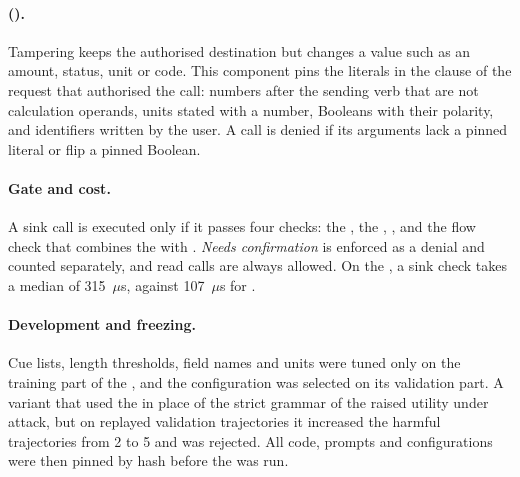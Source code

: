 \paragraph{\PThree{} (\cThree).} Tampering keeps the authorised destination but changes a value such as an amount,
status, unit or code. This component pins the literals in the clause of the request that authorised the call: numbers
after the sending verb that are not calculation operands, units stated with a number, Booleans with their polarity,
and identifiers written by the user. A call is denied if its arguments lack a pinned literal or flip a pinned Boolean.

\paragraph{Gate and cost.} A sink call is executed only if it passes four checks: the \rSig, the \pOne, \pThree, and the
flow check that combines the \rFlow{} with \pTwo. \emph{Needs confirmation} is enforced as a denial and counted
separately, and read calls are always allowed. On the \dev, a sink check takes a median of 315~$\mu$s, against
107~$\mu$s for \strSand.

\paragraph{Development and freezing.} Cue lists, length thresholds, field names and units were tuned only on the
training part of the \dev, and the configuration was selected on its validation part. A variant that used the \pOne{} in
place of the strict grammar of the \rSig{} raised utility under attack, but on replayed validation trajectories it
increased the harmful trajectories from 2 to 5 and was rejected. All code, prompts and configurations were then pinned
by hash before the \test{} was run.